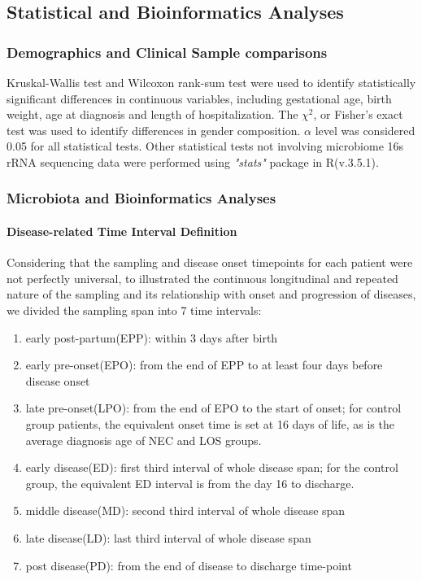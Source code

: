 \documentclass[fleqn,10pt, lineno]{wlpeerj} %
\begin{document}
  \subsection*{Statistical and Bioinformatics Analyses}
    \subsubsection*{Demographics and Clinical Sample comparisons}
    Kruskal-Wallis test and Wilcoxon rank-sum test were used to identify statistically significant differences in continuous variables, including gestational age, birth weight, age at diagnosis and length of hospitalization. The $\chi^2$, or Fisher's exact test was used to identify differences in gender composition. $\alpha$ level was considered 0.05 for all statistical tests. Other statistical tests not involving microbiome 16s rRNA sequencing data were performed using \textit{"stats"} package in R(v.3.5.1).
    \subsubsection*{Microbiota and Bioinformatics Analyses}
      \paragraph*{Disease-related Time Interval Definition}
      Considering that the sampling and disease onset timepoints for each patient were not perfectly universal, to illustrated the continuous longitudinal and repeated nature of the sampling and its relationship with onset and progression of diseases, we divided  the sampling span into 7 time intervals:
        \begin{enumerate}[noitemsep]
          \item early post-partum(EPP): within 3 days after birth
          \item early pre-onset(EPO): from the end of EPP to at least four days before disease onset
          \item late pre-onset(LPO): from the end of EPO to the start of onset; for control group patients, the equivalent onset time is set at 16 days of life, as is the average diagnosis age of NEC and LOS groups.
          \item early disease(ED): first third interval of whole disease span; for the control group, the equivalent ED interval is from the day 16  to discharge.
          \item middle disease(MD): second third interval of whole disease span
          \item late disease(LD): last third interval of whole disease span
          \item post disease(PD): from the end of disease to discharge time-point
        \end{enumerate}
\end{document}
